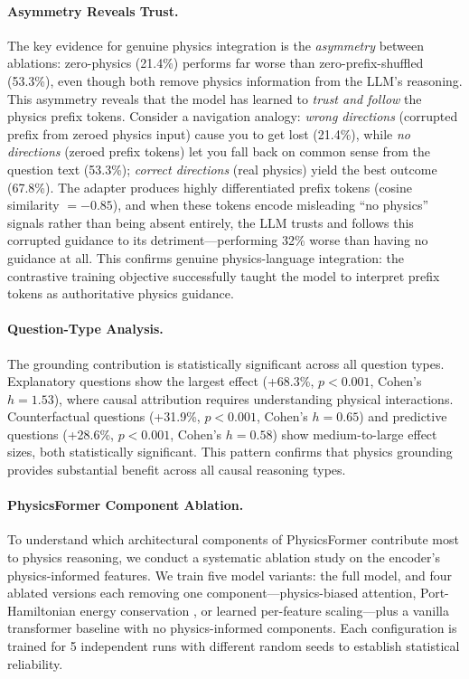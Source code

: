 \documentclass[conference]{IEEEtran}
\theoremstyle{plain}
\theoremstyle{definition}
\theoremstyle{remark}
\begin{document}
\paragraph{Asymmetry Reveals Trust.} The key evidence for genuine physics integration is the \emph{asymmetry} between ablations: zero-physics (21.4\%) performs far worse than zero-prefix-shuffled (53.3\%), even though both remove physics information from the LLM's reasoning. This asymmetry reveals that the model has learned to \emph{trust and follow} the physics prefix tokens. Consider a navigation analogy: \emph{wrong directions} (corrupted prefix from zeroed physics input) cause you to get lost (21.4\%), while \emph{no directions} (zeroed prefix tokens) let you fall back on common sense from the question text (53.3\%); \emph{correct directions} (real physics) yield the best outcome (67.8\%). The adapter produces highly differentiated prefix tokens (cosine similarity $=-0.85$), and when these tokens encode misleading ``no physics'' signals rather than being absent entirely, the LLM trusts and follows this corrupted guidance to its detriment---performing 32\% worse than having no guidance at all. This confirms genuine physics-language integration: the contrastive training objective successfully taught the model to interpret prefix tokens as authoritative physics guidance.

\paragraph{Question-Type Analysis.} The grounding contribution is statistically significant across all question types. Explanatory questions show the largest effect (+68.3\%, $p<0.001$, Cohen's $h=1.53$), where causal attribution requires understanding physical interactions. Counterfactual questions (+31.9\%, $p<0.001$, Cohen's $h=0.65$) and predictive questions (+28.6\%, $p<0.001$, Cohen's $h=0.58$) show medium-to-large effect sizes, both statistically significant. This pattern confirms that physics grounding provides substantial benefit across all causal reasoning types.

\paragraph{PhysicsFormer Component Ablation.} To understand which architectural components of PhysicsFormer contribute most to physics reasoning, we conduct a systematic ablation study on the encoder's physics-informed features. We train five model variants: the full model, and four ablated versions each removing one component---physics-biased attention, Port-Hamiltonian energy conservation \cite{desai2024phmarl}, or learned per-feature scaling---plus a vanilla transformer baseline with no physics-informed components. Each configuration is trained for 5 independent runs with different random seeds to establish statistical reliability.
\end{document}
